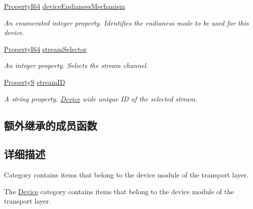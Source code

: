 \begin{DoxyCompactItemize}
\hyperlink{group___common_interface_ga81749b2696755513663492664a18a893}{Property\+I64} \hyperlink{classmv_i_m_p_a_c_t_1_1acquire_1_1_gen_i_cam_1_1_device_module_a161cbbee3d2b92bba2fddc81986ff048}{device\+Endianess\+Mechanism}
\begin{DoxyCompactList}\small\item\em An enumerated integer property. Identifies the endianess mode to be used for this device. \end{DoxyCompactList}\item 
\hyperlink{group___common_interface_ga81749b2696755513663492664a18a893}{Property\+I64} \hyperlink{classmv_i_m_p_a_c_t_1_1acquire_1_1_gen_i_cam_1_1_device_module_a3d38a6668eca0dd5e27bc4f95a00f420}{stream\+Selector}
\begin{DoxyCompactList}\small\item\em An integer property. Selects the stream channel. \end{DoxyCompactList}\item 
\hyperlink{classmv_i_m_p_a_c_t_1_1acquire_1_1_property_s}{Property\+S} \hyperlink{classmv_i_m_p_a_c_t_1_1acquire_1_1_gen_i_cam_1_1_device_module_acefeeecd40406db829ac522bb9a424b8}{stream\+I\+D}
\begin{DoxyCompactList}\small\item\em A string property. \hyperlink{classmv_i_m_p_a_c_t_1_1acquire_1_1_device}{Device} wide unique I\+D of the selected stream. \end{DoxyCompactList}\end{DoxyCompactItemize}
\subsection*{额外继承的成员函数}


\subsection{详细描述}
Category contains items that belong to the device module of the transport layer. 

The \hyperlink{classmv_i_m_p_a_c_t_1_1acquire_1_1_device}{Device} category contains items that belong to the device module of the transport layer. 

